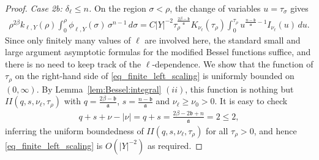 \documentclass[12pt]{amsart}
\begin{document}
\begin{proof}
\textit{Case 2b: $\delta_\ell \le n$.} On the region $\sigma<\rho$, the change of variables $u=\tau_\sigma$ gives
\begin{align}\label{eq_finite_left_scaling}
\rho^{2\beta}
    k_{\ell,Y}(\rho)
    \int_0^\rho
        \phi_{\ell,Y}(\sigma) \, \sigma^{n-1} \, d\sigma
    =
    C |Y|^{-2}
    \tau_\rho^{\frac{2\beta-\mathfrak b}{\mathfrak a}}
    K_{\nu_\ell}(\tau_\rho)
    \int_0^{\tau_\rho}
        u^{\frac{n-\mathfrak b}{\mathfrak a}-1}
        I_{\nu_\ell}(u) \, du.
\end{align}
Since only finitely many values of $\ell$ are involved here, the standard small and large argument asymptotic formulas for the modified Bessel functions suffice, and there is no need to keep track of the $\ell$-dependence. We show that the function of $\tau_\rho$ on the right-hand side of \eqref{eq_finite_left_scaling} is uniformly bounded on $(0,\infty)$. By Lemma~\ref{lem:Bessel:integral} $(ii)$, this function is nothing but $II(q,s,\nu_\ell,\tau_\rho)$ with $q=\frac{2\beta-\mathfrak b}{\mathfrak a}$, $s=\frac{n-\mathfrak b}{\mathfrak a}$ and $\nu_\ell \ge \nu_0>0$. It is easy to check 
\begin{align}\label{check}
    q+s+\nu-|\nu| = q+s = \frac{2\beta - 2\mathfrak b+n}{\mathfrak a} = 2 \le 2,
\end{align}
inferring the uniform boundedness of $II(q,s,\nu_\ell,\tau_\rho)$ for all $\tau_\rho >0$, and hence \eqref{eq_finite_left_scaling} is $O(|Y|^{-2})$ as required.


\end{proof}
\end{document}

